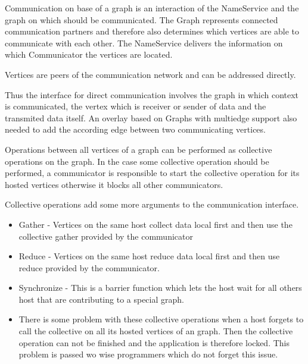 Communication on base of a graph is an interaction of the NameService
and the graph on which should be communicated. The Graph represents
connected communication partners and therefore also determines which
vertices are able to communicate with each other. The NameService
delivers the information on which Communicator the vertices are
located.

Vertices are peers of the communication network and can be addressed
directly.

Thus the interface for direct communication involves the graph in
which context is communicated, the vertex which is receiver or sender
of data and the transmited data itself. An overlay based on Graphs
with multiedge support also needed to add the according edge between
two communicating vertices.

Operations between all vertices of a graph can be performed as
collective operations on the graph.  In the case some collective
operation should be performed, a communicator is responsible to start
the collective operation for its hosted vertices otherwise it blocks
all other communicators.

Collective operations add some more arguments to the communication
interface.

\begin{itemize}
\item Gather - Vertices on the same host collect data local first and
  then use the collective gather provided by the communicator
\item Reduce - Vertices on the same host reduce data local first and
  then use reduce provided by the communicator.
\item Synchronize - This is a barrier function which lets the host
  wait for all others host that are contributing to a special graph.
\item There is some problem with these collective operations when a
  host forgets to call the collective on all its hosted vertices of an
  graph.  Then the collective operation can not be finished and the
  application is therefore locked. This problem is passed wo wise
  programmers which do not forget this issue.
\end{itemize}




